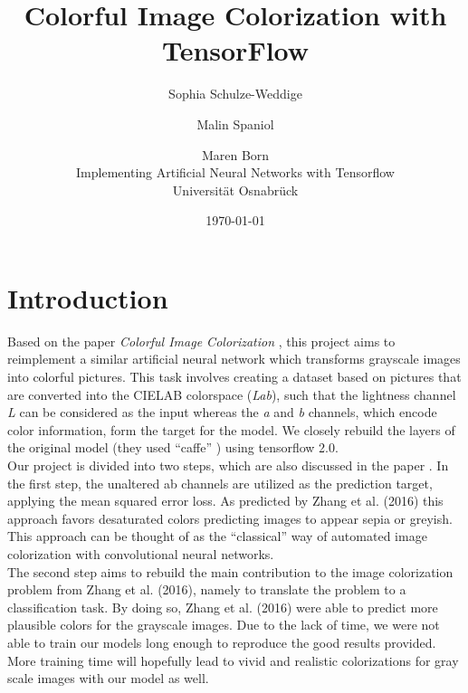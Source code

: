 \documentclass[12pt,letterpaper]{article}
\title{Colorful Image Colorization with TensorFlow}
\date{\today}
\author{Sophia Schulze-Weddige \and Malin Spaniol \and Maren Born \\Implementing Artificial Neural Networks with Tensorflow \\Universität Osnabrück}
\begin{document}
\maketitle
\thispagestyle{empty}
\newpage
\thispagestyle{empty}
\tableofcontents
\newpage
\section{Introduction}
Based on the paper \emph{Colorful Image Colorization} \citep{Zhang.2016}, this project aims to reimplement a similar artificial neural network which transforms grayscale images into colorful pictures. This task involves creating a dataset based on pictures that are converted into the CIELAB colorspace (\emph{Lab}), such that the lightness channel \emph{L} can be considered as the input whereas the \emph{a} and \emph{b} channels, which encode color information, form the target for the model. We closely rebuild the layers of the original model (they used \enquote{caffe} \citep{jia2014caffe}) using tensorflow 2.0.\\
Our project is divided into two steps, which are also discussed in the paper \citep{Zhang.2016}. In the first step, the unaltered ab channels are utilized as the prediction target, applying the mean squared error loss. As predicted by Zhang et al. (2016) this approach favors desaturated colors predicting images to appear sepia or greyish. This approach can be thought of as the \enquote{classical} way of automated image colorization with convolutional neural networks.\\
The second step aims to rebuild the main contribution to the image colorization problem from Zhang et al. (2016), namely to translate the problem to a classification task. By doing so, Zhang et al. (2016) were able to predict more plausible colors for the grayscale images. Due to the lack of time, we were not able to train our models long enough to reproduce the good results provided. More training time will hopefully lead to vivid and realistic colorizations for gray scale images with our model as well.
\end{document}

